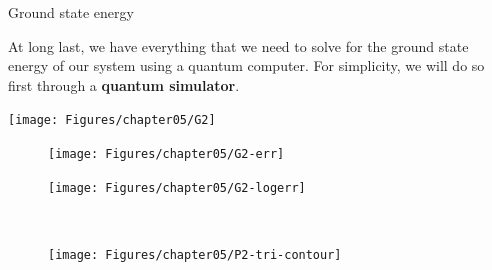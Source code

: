 \begin{frame}[allowframebreaks]{Ground state energy}

	At long last, we have everything that we need to solve for the ground state energy of our system using a quantum computer. For simplicity, we will do so first through a \textbf{quantum simulator}.

	\begin{center}
		\texttt{[image: Figures/chapter05/G2]}
	\end{center}
	\vspace{-2em}

\break

	\begin{figure}[!p]
		\centering
		\begin{minipage}[c]{.4\linewidth}
			\centering
			\texttt{[image: Figures/chapter05/G2-err]}
		\end{minipage}
		\hspace{.025\linewidth}
		\begin{minipage}[c]{.4\linewidth}
			\centering
			\texttt{[image: Figures/chapter05/G2-logerr]}
		\end{minipage} \\[-1em]
		\begin{center}
			\texttt{[image: Figures/chapter05/P2-tri-contour]}
		\end{center}
	\end{figure}
	\vspace{-2em}

\end{frame}
